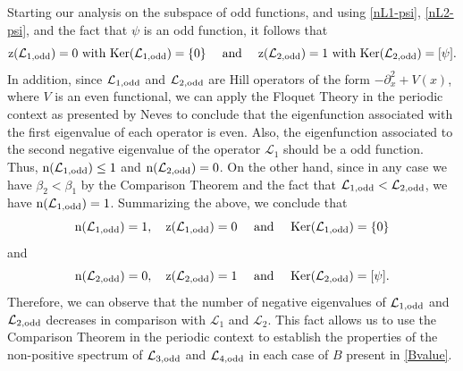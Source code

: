 \documentclass[10pt,reqno,a4paper]{amsart} %
\theoremstyle{definition} %
\numberwithin{equation}{section}
\numberwithin{figure}{section}
\begin{document}
Starting our analysis on the subspace of odd functions, and using \eqref{nL1-psi}, \eqref{nL2-psi}, and the fact that $\psi$ is an odd function, it follows that
\begin{equation*}
    {\rm z}(\mathcal{L}_{1,\rm odd}) = 0 \text{ with } {\rm Ker}(\mathcal{L}_{1,\rm odd}) = \{0\} \quad \text{ and } \quad {\rm z}(\mathcal{L}_{2,\rm odd}) = 1 \text{ with } {\rm Ker}(\mathcal{L}_{2,\rm odd}) = [\psi].
\end{equation*}
In addition, since $\mathcal{L}_{1,\rm odd}$ and $\mathcal{L}_{2,\rm odd}$ are Hill operators of the form $-\partial_x^2 + V(x)$, where $V$ is an even functional, we can apply the Floquet Theory in the periodic context as presented by Neves \cite{Neves} to conclude that the eigenfunction associated with the first eigenvalue of each operator is even. Also,  the eigenfunction associated to the second negative eigenvalue of the operator $\mathcal{L}_1$ should be a odd function.  Thus,  ${\rm n}(\mathcal{L}_{1,\rm odd}) \leq 1$ and  ${\rm n}(\mathcal{L}_{2,\rm odd}) = 0$. On the other hand,  since in any case we have $\beta_2<\beta_1$ by the Comparison Theorem and the fact that $\mathcal{L}_{1,\rm odd} < \mathcal{L}_{2,\rm odd}$, we have ${\rm n}(\mathcal{L}_{1,\rm odd}) = 1$. Summarizing the above, we conclude that
\begin{equation}\label{nL1-odd}
    {\rm n}(\mathcal{L}_{1,\rm odd}) = 1, \quad {\rm z}(\mathcal{L}_{1,\rm odd}) = 0 \quad \text{ and } \quad {\rm Ker}(\mathcal{L}_{1,\rm odd}) = \{0\}
\end{equation}
and
\begin{equation}\label{nL2-odd}
    {\rm n}(\mathcal{L}_{2,\rm odd}) = 0, \quad {\rm z}(\mathcal{L}_{2,\rm odd}) = 1 \quad \text{ and } \quad {\rm Ker}(\mathcal{L}_{2,\rm odd}) = [\psi].
\end{equation}
Therefore, we can observe that the number of negative eigenvalues of $\mathcal{L}_{1,\rm odd}$ and $\mathcal{L}_{2,\rm odd}$ decreases in comparison with $\mathcal{L}_1$ and $\mathcal{L}_2$. This fact allows us to use the Comparison Theorem in the periodic context \cite[Theorem 2.2.2]{Eastham} to establish the properties of the non-positive spectrum of $\mathcal{L}_{3,\rm odd}$ and $\mathcal{L}_{4,\rm odd}$ in each case of $B$ present in \eqref{Bvalue}.
\end{document}

